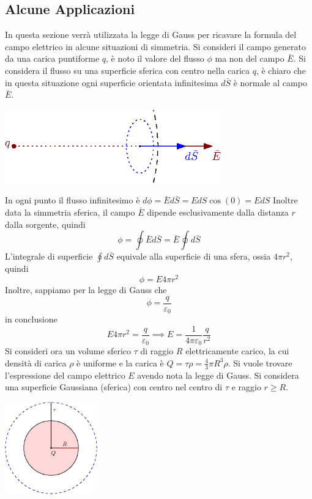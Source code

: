 \documentclass[10pt, letterpaper]{report}
\begin{document}
\subsection{Alcune Applicazioni}
In questa sezione verrà utilizzata la legge di Gauss per ricavare la formula del campo elettrico in alcune situazioni di simmetria.\acc 
Si consideri il campo generato da una carica puntiforme $q$, è noto il valore del flusso $\phi$ ma non del campo $\bar E$. Si considera il flusso su una superficie sferica con centro nella carica $q$, è chiaro che in questa situazione ogni superficie orientata infinitesima $d\bar S$ è normale al campo $\bar E$.\begin{center}
    \includegraphics[width=0.7\textwidth]{images/GaussEx1.eps}
\end{center}
In ogni punto il flusso infinitesimo è $d\phi=\bar Ed\bar S = EdS\cos(0)=EdS$
Inoltre data la simmetria sferica, il campo $\bar E$ dipende esclusivamente dalla distanza $r$ dalla sorgente, quindi 
$$\phi=\oint \bar Ed\bar S =\bar E\oint d\bar S $$
L'integrale di superficie $\oint d\bar S $ equivale alla superficie di una sfera, ossia $4\pi r^2$, quindi 
$$ \phi = E4\pi r^2$$
Inoltre, sappiamo per la legge di Gauss che 
$$ \phi = \frac{q}{\varepsilon_0}$$
in conclusione
$$
    E4\pi r^2= \frac{q}{\varepsilon_0}\implies E = \frac{1}{4\pi\varepsilon_0}\frac{q}{ r^2}
$$
Si consideri ora un volume sferico $\tau$ di raggio $R$ elettricamente carico, la cui densità di carica $\rho$ è uniforme e la carica è $Q=\tau\rho=\frac{4}{3}\pi R^3 \rho$. Si vuole trovare l'espressione del campo elettrico $E$ avendo nota la legge di Gauss. Si considera una superficie Gaussiana (sferica) con centro nel centro di $\tau$ e raggio $r\ge R$.
\begin{center}
    \includegraphics[width=0.3\textwidth]{images/sferaCarica.eps}
\end{center}
\end{document}

